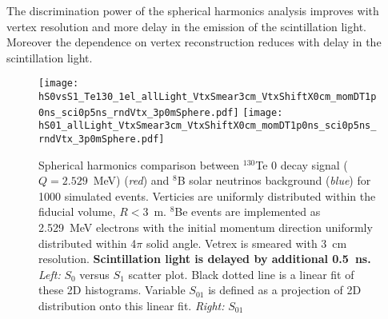 The discrimination power of the spherical harmonics analysis improves with vertex resolution and more delay in the emission of the scintillation light. Moreover the dependence on vertex reconstruction reduces with delay in the scintillation light. 

\begin{figure*}[h]
  \centering
  \texttt{[image: hS0vsS1\_Te130\_1el\_allLight\_VtxSmear3cm\_VtxShiftX0cm\_momDT1p0ns\_sci0p5ns\_rndVtx\_3p0mSphere.pdf]}
  \texttt{[image: hS01\_allLight\_VtxSmear3cm\_VtxShiftX0cm\_momDT1p0ns\_sci0p5ns\_rndVtx\_3p0mSphere.pdf]}
  \caption{Spherical harmonics comparison between $^{130}$Te 0{\nbb}
    decay signal ($Q=2.529$~MeV) (\emph{red}) and $^{8}$B solar
    neutrinos background (\emph{blue}) for 1000 simulated
    events. Verticies are uniformly distributed within the fiducial
    volume, $R<3$~m. $^8$Be events are implemented as 2.529~MeV
    electrons with the initial momentum direction uniformly
    distributed within 4$\pi$ solid angle. Vetrex is smeared with 3~cm
    resolution. {\bf Scintillation light is delayed by additional
      0.5~ns.} \emph{Left:} $S_0$ versus $S_1$ scatter plot. Black dotted
    line is a linear fit of these 2D histograms. Variable $S_{01}$ is
    defined as a projection of 2D distribution onto this linear
    fit. \emph{Right:} $S_{01}$}
\label{fig:SL_Te_SmearX3cm_momDT1ns_sci0p5ns_rndVtx_3p0m}
\end{figure*}

